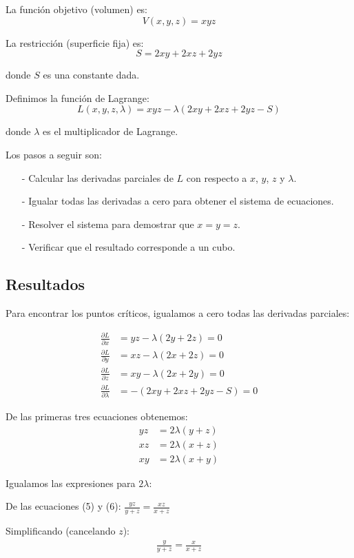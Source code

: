 \documentclass{article}
\begin{document}
La función objetivo (volumen) es:
$$V(x,y,z) = xyz$$

La restricción (superficie fija) es:
$$S = 2xy + 2xz + 2yz$$

donde $S$ es una constante dada.

Definimos la función de Lagrange:
$$L(x,y,z,\lambda) = xyz - \lambda(2xy + 2xz + 2yz - S)$$

donde $\lambda$ es el multiplicador de Lagrange.

Los pasos a seguir son:
\begin{enumerate}
    \item[-] Calcular las derivadas parciales de $L$ con respecto a $x$, $y$, $z$ y $\lambda$.
    \item[-] Igualar todas las derivadas a cero para obtener el sistema de ecuaciones.
    \item[-] Resolver el sistema para demostrar que $x = y = z$.
    \item[-] Verificar que el resultado corresponde a un cubo.
\end{enumerate}

\subsection{Resultados}
\setcounter{equation}{0}

Para encontrar los puntos críticos, igualamos a cero todas las derivadas parciales:

\begin{align}
\frac{\partial L}{\partial x} &= yz - \lambda(2y + 2z) = 0 \\
\frac{\partial L}{\partial y} &= xz - \lambda(2x + 2z) = 0 \\
\frac{\partial L}{\partial z} &= xy - \lambda(2x + 2y) = 0 \\
\frac{\partial L}{\partial \lambda} &= -(2xy + 2xz + 2yz - S) = 0
\end{align}

De las primeras tres ecuaciones obtenemos:
\begin{align}
yz &= 2\lambda(y + z) \\
xz &= 2\lambda(x + z) \\
xy &= 2\lambda(x + y)
\end{align}

Igualamos las expresiones para $2\lambda$:

De las ecuaciones (5) y (6): $\frac{yz}{y + z} = \frac{xz}{x + z}$

Simplificando (cancelando $z$):
\begin{align}
\frac{y}{y + z} = \frac{x}{x + z}
\end{align}
\end{document}
